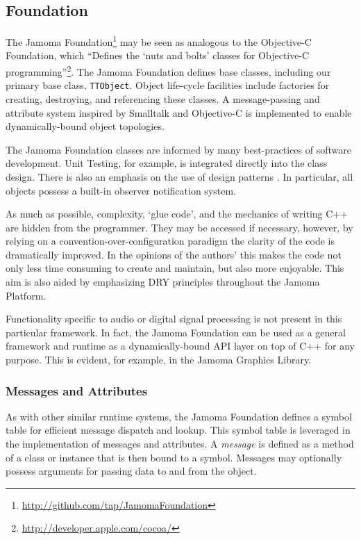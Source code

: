\documentclass[twoside,10pt]{article}
\begin{document}
\subsection{Foundation} %

The Jamoma Foundation\footnote{\url{http://github.com/tap/JamomaFoundation}} may be seen as analogous to the Objective-C Foundation, which ``Defines the `nuts and bolts' classes for Objective-C programming''\footnote{\url{http://developer.apple.com/cocoa/}}.  The Jamoma Foundation defines base classes, including our primary base class, \texttt{TTObject}.  Object life-cycle facilities include factories for creating, destroying, and referencing these classes.  A message-passing and attribute system inspired by Smalltalk and Objective-C is implemented to enable dynamically-bound object topologies.  

The Jamoma Foundation classes are informed by many best-practices of software development.  Unit Testing, for example, is integrated directly into the class design.  There is also an emphasis on the use of design patterns \cite{Gamma:1995}.  In particular, all objects possess a built-in observer notification system.  

As much as possible, complexity, `glue code', and the mechanics of writing C++ are hidden from the programmer.  They may be accessed if necessary, however, by relying on a convention-over-configuration paradigm the clarity of the code is dramatically improved.  In the opinions of the authors' this makes the code not only less time consuming to create and maintain, but also more enjoyable.  This aim is also aided by emphasizing DRY principles throughout the Jamoma Platform.

Functionality specific to audio or digital signal processing is not present in this particular framework.  In fact, the Jamoma Foundation can be used as a general framework and runtime as a dynamically-bound API layer on top of C++ for any purpose.  This is evident, for example, in the Jamoma Graphics Library.

\subsubsection{Messages and Attributes} %

As with other similar runtime systems, the Jamoma Foundation defines a symbol table for efficient message dispatch and lookup.  This symbol table is leveraged in the implementation of messages and attributes.  
A \emph{message} is defined as a method of a class or instance that is then bound to a symbol.  Messages may optionally possess arguments for passing data to and from the object.
\end{document}
